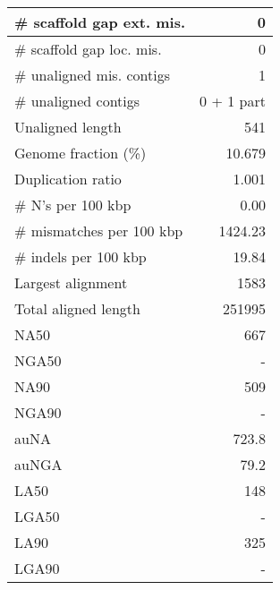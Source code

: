 \documentclass[12pt,a4paper]{article}
\begin{document}
\begin{table}[ht]
\begin{center}
\begin{tabular}{|l*{1}{|r}|}
\# scaffold gap ext. mis. & 0 \\ \hline
\# scaffold gap loc. mis. & 0 \\ \hline
\# unaligned mis. contigs & 1 \\ \hline
\# unaligned contigs & 0 + 1 part \\ \hline
Unaligned length & 541 \\ \hline
Genome fraction (\%) & 10.679 \\ \hline
Duplication ratio & 1.001 \\ \hline
\# N's per 100 kbp & 0.00 \\ \hline
\# mismatches per 100 kbp & 1424.23 \\ \hline
\# indels per 100 kbp & 19.84 \\ \hline
Largest alignment & 1583 \\ \hline
Total aligned length & 251995 \\ \hline
NA50 & 667 \\ \hline
NGA50 & - \\ \hline
NA90 & 509 \\ \hline
NGA90 & - \\ \hline
auNA & 723.8 \\ \hline
auNGA & 79.2 \\ \hline
LA50 & 148 \\ \hline
LGA50 & - \\ \hline
LA90 & 325 \\ \hline
LGA90 & - \\ \hline
\end{tabular}
\end{center}
\end{table}
\end{document}
